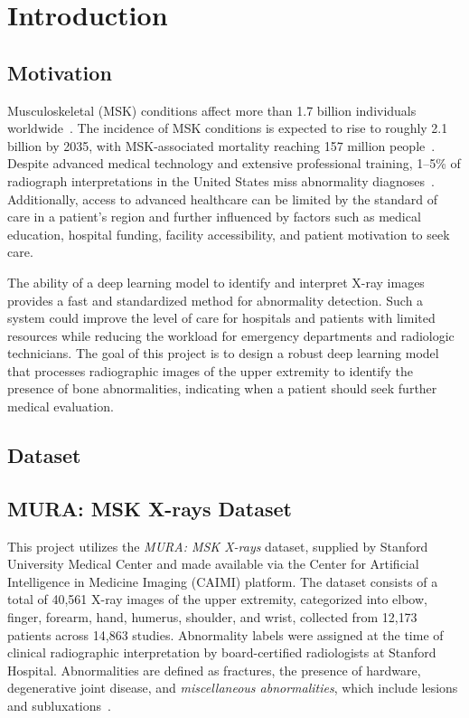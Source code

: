 \documentclass[conference]{IEEEtran}
\begin{document}
\section{Introduction}
\subsection{Motivation}
Musculoskeletal (MSK) conditions affect more than 1.7 billion individuals worldwide~\cite{usbji2014bmus}. The incidence of MSK conditions is expected to rise to roughly 2.1 billion by 2035, with MSK-associated mortality reaching 157 million people~\cite{liu2025_global_msk}. Despite advanced medical technology and extensive professional training, 1--5\% of radiograph interpretations in the United States miss abnormality diagnoses~\cite{zech2022ai_fracture,newman_toker2022_diag_errors}.  Additionally, access to advanced healthcare can be limited by the standard of care in a patient's region and further influenced by factors such as medical education, hospital funding, facility accessibility, and patient motivation to seek care. 

The ability of a deep learning model to identify and interpret X-ray images provides a fast and standardized method for abnormality detection. Such a system could improve the level of care for hospitals and patients with limited resources while reducing the workload for emergency departments and radiologic technicians. The goal of this project is to design a robust deep learning model that processes radiographic images of the upper extremity to identify the presence of bone abnormalities, indicating when a patient should seek further medical evaluation.
\subsection{Dataset}
\subsection{MURA: MSK X-rays Dataset}

This project utilizes the \textit{MURA: MSK X-rays} dataset, supplied by Stanford University Medical Center and made available via the Center for Artificial Intelligence in Medicine Imaging (CAIMI) platform. The dataset consists of a total of 40{,}561 X-ray images of the upper extremity, categorized into elbow, finger, forearm, hand, humerus, shoulder, and wrist, collected from 12{,}173 patients across 14{,}863 studies.  Abnormality labels were assigned at the time of clinical radiographic interpretation by board-certified radiologists at Stanford Hospital. Abnormalities are defined as fractures, the presence of hardware, degenerative joint disease, and \textit{miscellaneous abnormalities}, which include lesions and subluxations~\cite{rajpurkar2018mura}. 
\end{document}
